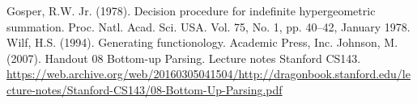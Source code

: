 Gosper, R.W. Jr. (1978). Decision procedure for indefinite hypergeometric summation. Proc. Natl. Acad. Sci. USA. Vol. 75, No. 1, pp. 40--42, January 1978.\label{Ref: gosper}
Wilf, H.S. (1994). Generating functionology. Academic Press, Inc.\label{Ref: wilf}
Johnson, M. (2007). Handout 08 Bottom-up Parsing. Lecture notes Stanford CS143. \url{https://web.archive.org/web/20160305041504/http://dragonbook.stanford.edu/lecture-notes/Stanford-CS143/08-Bottom-Up-Parsing.pdf}\label{Ref: parser}

